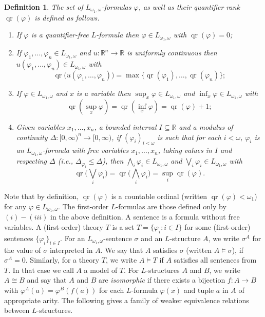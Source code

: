 \documentclass[12pt]{amsart}
\newtheorem{definition}[theorem]{Definition}
\DeclareMathOperator{\qr}{qr}
\begin{document}
\begin{definition}\label{def: Metric Infinitary Formulas}
    The set of $L_{\omega_1, \omega}$-formulas $\varphi$, as well as their \textit{quantifier rank} $\qr(\varphi)$ is defined as follows.
    \begin{enumerate}
        \item[(i)] If $\varphi$ is a quantifier-free $L$-formula then $\varphi\in L_{\omega_1, \omega}$ with $\qr(\varphi)=0$;
        \item[(ii)] If $\varphi_1,\dots,\varphi_n\in L_{\omega_1, \omega}$ and $u \colon \mathbb R^n\to\mathbb R$ is uniformly continuous then $u(\varphi_1,\dots,\varphi_n)\in L_{\omega_1, \omega}$ with 
        \[\qr\big(u(\varphi_1,\dots,\varphi_n)\big)=\max\big\{\qr(\varphi_1),\dots,\qr(\varphi_n)\big\};\]
        \item[(iii)] If $\varphi\in L_{\omega_1, \omega}$ and $x$ is a variable then $\sup_x\varphi\in L_{\omega_1, \omega}$ and $\inf_x\varphi\in L_{\omega_1, \omega}$ with 
        \[\qr({\sup}_x\varphi)=\qr({\inf}_x\varphi)=\qr(\varphi)+1;\]
        \item[(iv)] Given variables $x_1,\dots,x_n$, a bounded interval $I\subseteq\mathbb R$ and a modulus of continuity $\Delta \colon [0,\infty)^n\to[0,\infty)$, if $(\varphi_i)_{i<\omega}$ is such that for each $i<\omega$, $\varphi_i$ is an $L_{\omega_1, \omega}$-formula with free variables $x_1,\dots,x_n$, taking values in $I$ and respecting $\Delta$ (i.e., $\Delta_{\varphi_i} \leq \Delta$), then $\bigwedge_i\varphi_i\in L_{\omega_1,\omega}$ and $\bigvee_i\varphi_i\in L_{\omega_1, \omega}$ with 
        \[\qr\Big(\bigvee_i\varphi_i\Big)=\qr\Big(\bigwedge_i\varphi_i\Big)=\sup_i\qr(\varphi).\]
    \end{enumerate}
\end{definition}

Note that by definition, $\qr(\varphi)$ is a countable ordinal (written $\qr(\varphi)<\omega_1$) for any $\varphi\in L_{\omega_1, \omega}$. 
The first-order $L$-formulas are those defined only by $(i)-(iii)$ in the above definition. A sentence is a formula without free variables. A (first-order) theory $T$ is a set $T=\{ \varphi_i \colon i \in I \}$ for some (first-order) sentences $\{\varphi_i\}_{i \in I}$. For an $L_{\omega_1, \omega}$-sentence $\sigma$ and an $L$-structure $A$, we write $\sigma^A$ for the value of $\sigma$ interpreted in $A$. We say that $A$ satisfies $\sigma$ (written $A \models \sigma$), if $\sigma^A = 0$. Similarly, for a theory $T$, we write $A \models T$ if $A$ satisfies all sentences from $T$. In that case we call $A$ a model of $T$. For $L$-structures $A$ and $B$, we write $A\cong B$ and say that $A$ and $B$ are \textit{isomorphic} if there exists a bijection $f:A\to B$ with $\varphi^A(a)=\varphi^B(f(a))$ for each $L$-formula $\varphi(x)$ and tuple $a$ in $A$ of appropriate arity. The following gives a family of weaker equivalence relations between $L$-structures.
\end{document}
